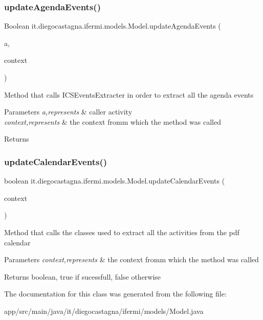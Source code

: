 \subsubsection{\texorpdfstring{updateAgendaEvents()}{updateAgendaEvents()}}
{\footnotesize\ttfamily Boolean it.\+diegocastagna.\+ifermi.\+models.\+Model.\+update\+Agenda\+Events (\begin{DoxyParamCaption}\item[{\mbox{\hyperlink{classit_1_1diegocastagna_1_1ifermi_1_1activity_1_1_agenda_activity}{Agenda\+Activity}}}]{a,  }\item[{Context}]{context }\end{DoxyParamCaption})\hspace{0.3cm}{\ttfamily [inline]}}

Method that calls I\+C\+S\+Events\+Extracter in order to extract all the agenda events 
\begin{DoxyParams}{Parameters}
{\em a,represents} & caller activity \\
\hline
{\em context,represents} & the context fromm which the method was called \\
\hline
\end{DoxyParams}
\begin{DoxyReturn}{Returns}

\end{DoxyReturn}
\mbox{\label{classit_1_1diegocastagna_1_1ifermi_1_1models_1_1_model_a4319427f5c24de469a4a420f1577fa07}} 
\subsubsection{\texorpdfstring{updateCalendarEvents()}{updateCalendarEvents()}}
{\footnotesize\ttfamily boolean it.\+diegocastagna.\+ifermi.\+models.\+Model.\+update\+Calendar\+Events (\begin{DoxyParamCaption}\item[{Context}]{context }\end{DoxyParamCaption})\hspace{0.3cm}{\ttfamily [inline]}}

Method that calls the classes used to extract all the activities from the pdf calendar 
\begin{DoxyParams}{Parameters}
{\em context,represents} & the context fromm which the method was called \\
\hline
\end{DoxyParams}
\begin{DoxyReturn}{Returns}
boolean, true if sucessfull, false otherwise 
\end{DoxyReturn}


The documentation for this class was generated from the following file\+:\begin{DoxyCompactItemize}
\item 
app/src/main/java/it/diegocastagna/ifermi/models/Model.\+java\end{DoxyCompactItemize}
